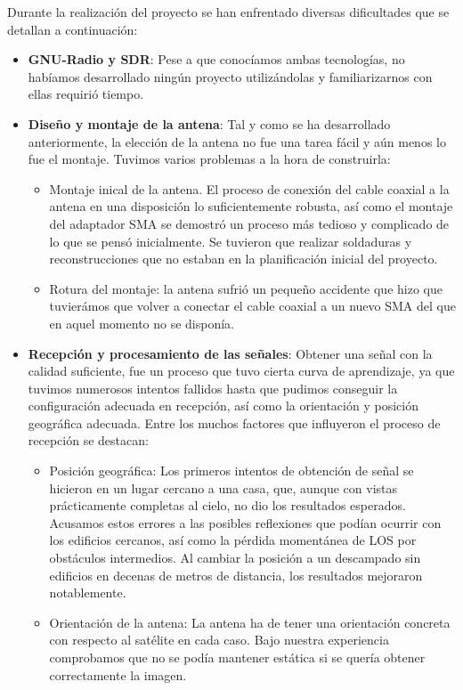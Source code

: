 \documentclass[a4paper,openright,12pt]{article}
\begin{document}
Durante la realización del proyecto se han enfrentado diversas dificultades que se detallan a continuación:
\begin{itemize}

    \item \textbf{GNU-Radio y SDR}: Pese a que conocíamos ambas tecnologías, no habíamos desarrollado ningún proyecto utilizándolas y familiarizarnos con ellas requirió tiempo.
    \item \textbf{Diseño y montaje de la antena}: Tal y como se ha desarrollado anteriormente, la elección de la antena no fue una tarea fácil y aún menos lo fue el montaje. Tuvimos varios problemas a la hora de construirla:
    \begin{itemize}
        \item Montaje inical de la antena. El proceso de conexión del cable coaxial a la antena en una disposición lo suficientemente robusta, así como el montaje del adaptador SMA se demostró un proceso más tedioso y complicado de lo que se pensó inicialmente. Se tuvieron que realizar soldaduras y reconstrucciones que no estaban en la planificación inicial del proyecto.
        \item Rotura del montaje: la antena sufrió un pequeño accidente que hizo que tuvierámos que volver a conectar el cable coaxial a un nuevo SMA del que en aquel momento no se disponía.
    \end{itemize}
    \item \textbf{Recepción y procesamiento de las señales}: Obtener una señal con la calidad suficiente, fue un proceso que tuvo cierta curva de aprendizaje, ya que tuvimos numerosos intentos fallidos hasta que pudimos conseguir la configuración adecuada en recepción, así como la orientación y posición geográfica adecuada. Entre los muchos factores que influyeron el proceso de recepción se destacan:
    \begin{itemize}
    		\item Posición geográfica: Los primeros intentos de obtención de señal se hicieron en un lugar cercano a una casa, que, aunque con vistas prácticamente completas al cielo, no dio los resultados esperados. Acusamos estos errores a las posibles reflexiones que podían ocurrir con los edificios cercanos, así como la pérdida momentánea de LOS por obstáculos intermedios. Al cambiar la posición a un descampado sin edificios en decenas de metros de distancia, los resultados mejoraron notablemente.
        \item Orientación de la antena: La antena ha de tener una orientación concreta con respecto al satélite en cada caso. Bajo nuestra experiencia comprobamos que no se podía mantener estática si se quería obtener correctamente la imagen. 

\end{itemize}
\end{itemize}
\end{document}

